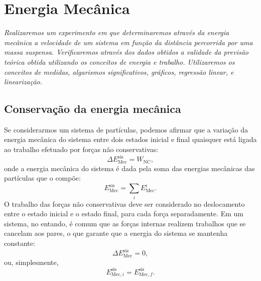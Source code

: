 \chapter{Energia Mecânica} %
\label{Chap:NomeDoExp}        %

\begin{fullwidth}\it
Realizaremos um experimento em que determinaremos através da energia mecânica a velocidade de um sistema em função da distância percorrida por uma massa suspensa. Verificaremos através dos dados obtidos a validade da previsão teórica obtida utilizando os conceitos de energia e trabalho. Utilizaremos os conceitos de medidas, algarismos significativos, gráficos, regressão linear, e linearização.
\end{fullwidth}

\section{Conservação da energia mecânica}

Se considerarmos um sistema de partículas, podemos afirmar que a variação da energia mecânica do sistema entre dois estados inicial e final quaisquer está ligada ao trabalho efetuado por forças não conservativas:
\begin{equation}\label{Eq:VariacaoEnergiaMecanica}
    \Delta E_{\text{Mec}}^{\text{sis}} = W_{\text{NC}},
\end{equation}
%
onde a energia mecânica do sistema é dada pela soma das energias mecânicas das partículas que o compõe:
\begin{equation}
    E_{\text{Mec}}^{\text{sis}} = \sum_{i} E_{\text{Mec}}^i.
\end{equation}
%
O trabalho das forças não conservativas deve ser considerado no deslocamento entre o estado inicial e o estado final, para cada força separadamente. Em um sistema, no entando, é comum que as forças internas realizem trabalhos que se cancelam aos pares, o que garante que a energia do sistema se mantenha constante:
\begin{equation}
    \Delta E_{\text{Mec}}^{\text{sis}} = 0,
\end{equation}
%
ou, simplesmente,
\begin{equation}
    E_{\text{Mec},i}^{\text{sis}} = E_{\text{Mec},f}^{\text{sis}}.
\end{equation}

